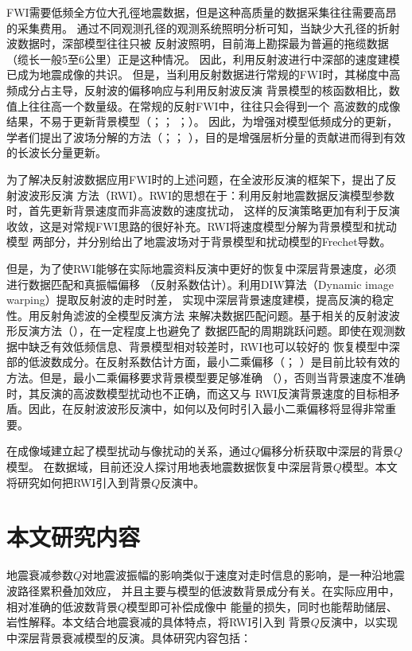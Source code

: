 FWI需要低频全方位大孔徑地震数据，但是这种高质量的数据采集往往需要高昂的采集费用。
通过不同观测孔径的观测系统照明分析可知，当缺少大孔径的折射波数据时，深部模型往往只被
反射波照明，目前海上勘探最为普遍的拖缆数据（缆长一般5至6公里）正是这种情况。
因此，利用反射波进行中深部的速度建模已成为地震成像的共识。
但是，当利用反射数据进行常规的FWI时，其梯度中高频成分占主导，反射波的偏移响应与利用反射波反演
背景模型的核函数相比，数值上往往高一个数量级。在常规的反射FWI中，往往只会得到一个
高波数的成像结果，不易于更新背景模型（；；
；）。
因此，为增强对模型低频成分的更新，学者们提出了波场分解的方法（；；
），目的是增强层析分量的贡献进而得到有效的长波长分量更新。

为了解决反射波数据应用FWI时的上述问题，在全波形反演的框架下，提出了反射波波形反演
方法（RWI）。RWI的思想在于：利用反射地震数据反演模型参数时，首先更新背景速度而非高波数的速度扰动，
这样的反演策略更加有利于反演收敛，这是对常规FWI思路的很好补充。RWI将速度模型分解为背景模型和扰动模型
两部分，并分别给出了地震波场对于背景模型和扰动模型的Frechet导数。

但是，为了使RWI能够在实际地震资料反演中更好的恢复中深层背景速度，必须进行数据匹配和真振幅偏移
（反射系数估计）。利用DIW算法（Dynamic image warping）提取反射波的走时时差，
实现中深层背景速度建模，提高反演的稳定性。用反射角滤波的全模型反演方法
来解决数据匹配问题。基于相关的反射波波形反演方法（），在一定程度上也避免了
数据匹配的周期跳跃问题。即使在观测数据中缺乏有效低频信息、背景模型相对较差时，RWI也可以较好的
恢复模型中深部的低波数成分。在反射系数估计方面，最小二乘偏移（；
）是目前比较有效的方法。但是，最小二乘偏移要求背景模型要足够准确
（），否则当背景速度不准确时，其反演的高波数模型扰动也不正确，而这又与
RWI反演背景速度的目标相矛盾。因此，在反射波波形反演中，如何以及何时引入最小二乘偏移将显得非常重要。

在成像域建立起了模型扰动与像扰动的关系，通过$Q$偏移分析获取中深层的背景$Q$模型。
在数据域，目前还没人探讨用地表地震数据恢复中深层背景$Q$模型。本文将研究如何把RWI引入到背景$Q$反演中。

\vspace{0.5cm}
\section{本文研究内容}
地震衰减参数$Q$对地震波振幅的影响类似于速度对走时信息的影响，是一种沿地震波路径累积叠加效应，
并且主要与模型的低波数背景成分有关。在实际应用中，相对准确的低波数背景$Q$模型即可补偿成像中
能量的损失，同时也能帮助储层、岩性解释。本文结合地震衰减的具体特点，将RWI引入到
背景$Q$反演中，以实现中深层背景衰减模型的反演。具体研究内容包括：

